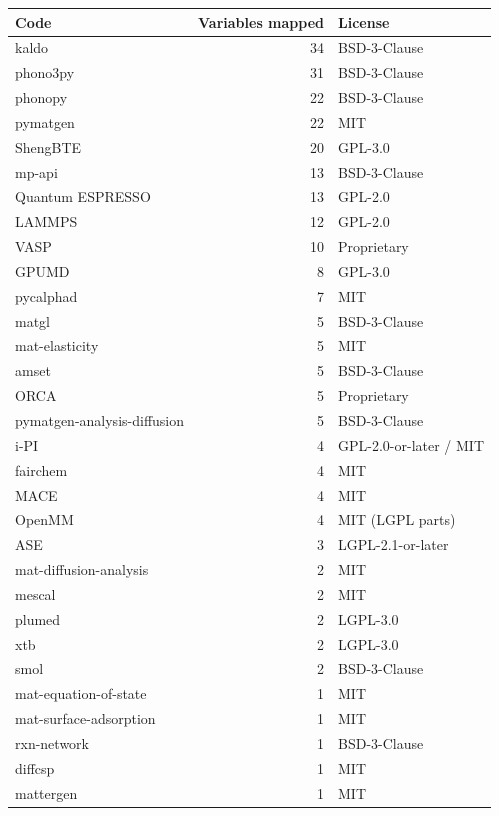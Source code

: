 \documentclass[11pt,a4paper]{article}
\begin{document}
\begin{center}
\begin{tabular}{lrl}
\toprule
Code & Variables mapped & License \\
\midrule
kaldo                        & 34 & BSD-3-Clause \\
phono3py                     & 31 & BSD-3-Clause \\
phonopy                      & 22 & BSD-3-Clause \\
pymatgen                     & 22 & MIT \\
ShengBTE                     & 20 & GPL-3.0 \\
mp-api                       & 13 & BSD-3-Clause \\
Quantum ESPRESSO             & 13 & GPL-2.0 \\
LAMMPS                       & 12 & GPL-2.0 \\
VASP                         & 10 & Proprietary \\
GPUMD                        & 8  & GPL-3.0 \\
pycalphad                    & 7  & MIT \\
matgl                        & 5  & BSD-3-Clause \\
mat-elasticity               & 5  & MIT \\
amset                        & 5  & BSD-3-Clause \\
ORCA                         & 5  & Proprietary \\
pymatgen-analysis-diffusion  & 5  & BSD-3-Clause \\
i-PI                         & 4  & GPL-2.0-or-later / MIT \\
fairchem                     & 4  & MIT \\
MACE                         & 4  & MIT \\
OpenMM                       & 4  & MIT (LGPL parts) \\
ASE                          & 3  & LGPL-2.1-or-later \\
mat-diffusion-analysis       & 2  & MIT \\
mescal                       & 2  & MIT \\
plumed                       & 2  & LGPL-3.0 \\
xtb                          & 2  & LGPL-3.0 \\
smol                         & 2  & BSD-3-Clause \\
mat-equation-of-state        & 1  & MIT \\
mat-surface-adsorption       & 1  & MIT \\
rxn-network                  & 1  & BSD-3-Clause \\
diffcsp                      & 1  & MIT \\
mattergen                    & 1  & MIT \\
\bottomrule
\end{tabular}
\end{center}
\end{document}
